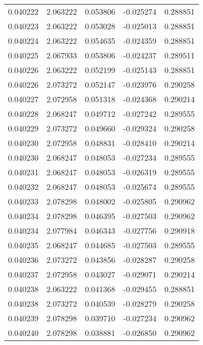 \begin{tabular}{lrrrr}
0.040222    &  2.063222 &  0.053806 & -0.025274 &             0.288851 \\
0.040223    &  2.063222 &  0.053028 & -0.025013 &             0.288851 \\
0.040224    &  2.063222 &  0.054635 & -0.024359 &             0.288851 \\
0.040225    &  2.067933 &  0.053806 & -0.024237 &             0.289511 \\
0.040226    &  2.063222 &  0.052199 & -0.025143 &             0.288851 \\
0.040226    &  2.073272 &  0.052147 & -0.023976 &             0.290258 \\
0.040227    &  2.072958 &  0.051318 & -0.024368 &             0.290214 \\
0.040228    &  2.068247 &  0.049712 & -0.027242 &             0.289555 \\
0.040229    &  2.073272 &  0.049660 & -0.029324 &             0.290258 \\
0.040230    &  2.072958 &  0.048831 & -0.028410 &             0.290214 \\
0.040230    &  2.068247 &  0.048053 & -0.027234 &             0.289555 \\
0.040231    &  2.068247 &  0.048053 & -0.026319 &             0.289555 \\
0.040232    &  2.068247 &  0.048053 & -0.025674 &             0.289555 \\
0.040233    &  2.078298 &  0.048002 & -0.025805 &             0.290962 \\
0.040234    &  2.078298 &  0.046395 & -0.027503 &             0.290962 \\
0.040234    &  2.077984 &  0.046343 & -0.027756 &             0.290918 \\
0.040235    &  2.068247 &  0.044685 & -0.027503 &             0.289555 \\
0.040236    &  2.073272 &  0.043856 & -0.028287 &             0.290258 \\
0.040237    &  2.072958 &  0.043027 & -0.029071 &             0.290214 \\
0.040238    &  2.063222 &  0.041368 & -0.029455 &             0.288851 \\
0.040238    &  2.073272 &  0.040539 & -0.028279 &             0.290258 \\
0.040239    &  2.078298 &  0.039710 & -0.027234 &             0.290962 \\
0.040240    &  2.078298 &  0.038881 & -0.026850 &             0.290962 \\

\end{tabular}
